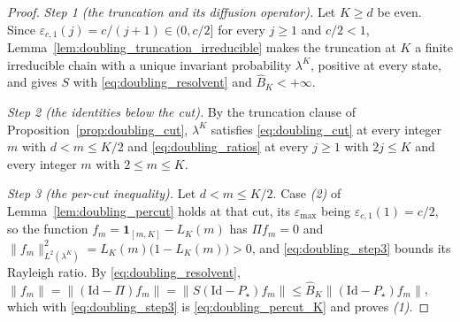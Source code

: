 \begin{proof}
\emph{Step 1 (the truncation and its diffusion operator).} Let $K\geq d$ be even. Since
$\varepsilon_{c,1}(j)=c/(j+1)\in(0,c/2]$ for every $j\geq1$ and $c/2<1$,
Lemma~\ref{lem:doubling_truncation_irreducible} makes the truncation at $K$ a finite
irreducible chain with a unique invariant probability $\lambda^K$, positive at every state,
and gives $S$ with \eqref{eq:doubling_resolvent} and $\widehat B_K<+\infty$.

\emph{Step 2 (the identities below the cut).} By the truncation clause of
Proposition~\ref{prop:doubling_cut}, $\lambda^K$ satisfies \eqref{eq:doubling_cut} at every
integer $m$ with $d<m\leq K/2$ and \eqref{eq:doubling_ratios} at every $j\geq1$ with $2j\leq K$
and every integer $m$ with $2\leq m\leq K$.

\emph{Step 3 (the per-cut inequality).} Let $d<m\leq K/2$. Case \emph{(2)} of
Lemma~\ref{lem:doubling_percut} holds at that cut, its $\varepsilon_{\max}$ being
$\varepsilon_{c,1}(1)=c/2$, so the function $f_m=\mathbf 1_{[m,K]}-L_K(m)$ has $\Pi f_m=0$ and
$\|f_m\|^2_{L^2(\lambda^K)}=L_K(m)\bigl(1-L_K(m)\bigr)>0$, and \eqref{eq:doubling_step3}
bounds its Rayleigh ratio. By \eqref{eq:doubling_resolvent},
$\|f_m\|=\|(\mathrm{Id}-\Pi)f_m\|=\|S(\mathrm{Id}-P_\star)f_m\|\leq\widehat B_K\|(\mathrm{Id}-P_\star)f_m\|$,
which with \eqref{eq:doubling_step3} is \eqref{eq:doubling_percut_K} and proves \emph{(1)}.


\end{proof}
